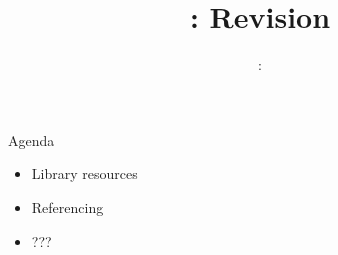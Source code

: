 \usepackage{../../beamerthemeFalmouthGamesAcademy}
\usepackage{multimedia}
\graphicspath{ {../../} }

\lstset{language=Python
}

\usepackage[normalem]{ulem}
\usepackage{wasysym}

\usepackage{pdfpages}

\usetikzlibrary{arrows,automata}




\title{\sessionnumber: Revision}
\subtitle{\modulecode: \moduletitle}

\frame{\titlepage} 

\begin{frame}{Agenda}
	\begin{itemize}
		\item Library resources
		\item Referencing
		\item ???
	\end{itemize}
\end{frame}





